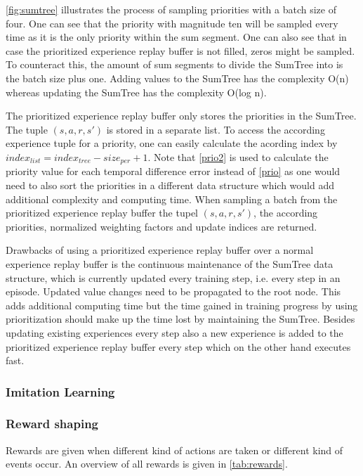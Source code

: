 \autoref{fig:sumtree} illustrates the process of sampling priorities with a batch size of four. One can see that the priority with magnitude ten will be sampled every time as it is the only priority within the sum segment. One can also see that in case the prioritized experience replay buffer is not filled, zeros might be sampled. To counteract this, the amount of sum segments to divide the SumTree into is the batch size plus one. Adding values to the SumTree has the complexity O(n) whereas updating the SumTree has the complexity O(log n). 

The prioritized experience replay buffer only stores the priorities in the SumTree. The tuple $(s,a,r,s')$ is stored in a separate list. To access the according experience tuple for a priority, one can easily calculate the acording index by $index_{list} = index_{tree} - size_{per} + 1$. Note that \autoref{prio2} is used to calculate the priority value for each temporal difference error instead of \autoref{prio} as one would need to also sort the priorities in a different data structure which would add additional complexity and computing time. When sampling a batch from the prioritized experience replay buffer the tupel $(s,a,r,s')$, the according priorities, normalized weighting factors and update indices are returned. 

Drawbacks of using a prioritized experience replay buffer over a normal experience replay buffer is the continuous maintenance of the SumTree data structure, which is currently updated every training step, i.e. every step in an episode. Updated value changes need to be propagated to the root node. This adds additional computing time but the time gained in training progress by using prioritization should make up the time lost by maintaining the SumTree. Besides updating existing experiences every step also a new experience is added to the prioritized experience replay buffer every step which on the other hand executes fast. 

\subsubsection{Imitation Learning}
\label{ch:approachBc}

\subsubsection{Reward shaping}
\label{ch:approachBd}

Rewards are given when different kind of actions are taken or different kind of events occur. An overview of all rewards is given in \autoref{tab:rewards}.

